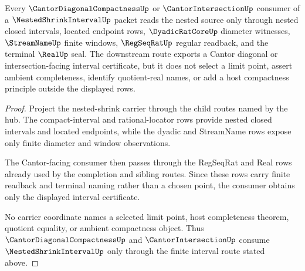 \begin{theorem}
\label{thm:nested-shrink-interval-cantor-downstream-route}
Every $\CantorDiagonalCompactnessUp$ or $\CantorIntersectionUp$ consumer of a $\NestedShrinkIntervalUp$ packet reads the nested source only through nested closed intervals, located endpoint rows, $\DyadicRatCoreUp$ diameter witnesses, $\StreamNameUp$ finite windows, $\RegSeqRatUp$ regular readback, and the terminal $\RealUp$ seal. The downstream route exports a Cantor diagonal or intersection-facing interval certificate, but it does not select a limit point, assert ambient completeness, identify quotient-real names, or add a host compactness principle outside the displayed rows.
\end{theorem}
\begin{proof}
Project the nested-shrink carrier through the child routes named by the hub. The compact-interval and rational-locator rows provide nested closed intervals and located endpoints, while the dyadic and StreamName rows expose only finite diameter and window observations.

The Cantor-facing consumer then passes through the RegSeqRat and Real rows already used by the completion and sibling routes. Since these rows carry finite readback and terminal naming rather than a chosen point, the consumer obtains only the displayed interval certificate.

No carrier coordinate names a selected limit point, host completeness theorem, quotient equality, or ambient compactness object. Thus $\CantorDiagonalCompactnessUp$ and $\CantorIntersectionUp$ consume $\NestedShrinkIntervalUp$ only through the finite interval route stated above.
\end{proof}
